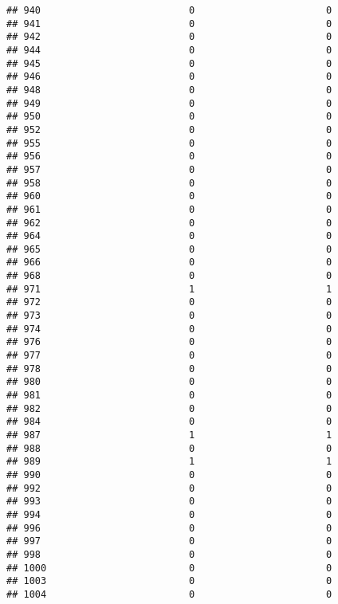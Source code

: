 \documentclass[
]{article}
\begin{document}
\begin{verbatim}
## 940                          0                       0
## 941                          0                       0
## 942                          0                       0
## 944                          0                       0
## 945                          0                       0
## 946                          0                       0
## 948                          0                       0
## 949                          0                       0
## 950                          0                       0
## 952                          0                       0
## 955                          0                       0
## 956                          0                       0
## 957                          0                       0
## 958                          0                       0
## 960                          0                       0
## 961                          0                       0
## 962                          0                       0
## 964                          0                       0
## 965                          0                       0
## 966                          0                       0
## 968                          0                       0
## 971                          1                       1
## 972                          0                       0
## 973                          0                       0
## 974                          0                       0
## 976                          0                       0
## 977                          0                       0
## 978                          0                       0
## 980                          0                       0
## 981                          0                       0
## 982                          0                       0
## 984                          0                       0
## 987                          1                       1
## 988                          0                       0
## 989                          1                       1
## 990                          0                       0
## 992                          0                       0
## 993                          0                       0
## 994                          0                       0
## 996                          0                       0
## 997                          0                       0
## 998                          0                       0
## 1000                         0                       0
## 1003                         0                       0
## 1004                         0                       0

\end{verbatim}
\end{document}

